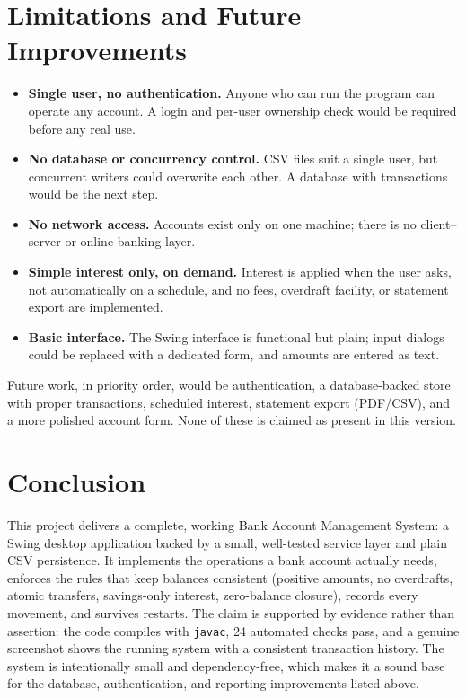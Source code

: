 \documentclass[11pt,a4paper]{report}
\begin{document}
\section{Limitations and Future Improvements}
\label{sec:limitations}
\begin{itemize}
    \item \textbf{Single user, no authentication.} Anyone who can run the program can operate any account. A login and per-user ownership check would be required before any real use.
    \item \textbf{No database or concurrency control.} CSV files suit a single user, but concurrent writers could overwrite each other. A database with transactions would be the next step.
    \item \textbf{No network access.} Accounts exist only on one machine; there is no client--server or online-banking layer.
    \item \textbf{Simple interest only, on demand.} Interest is applied when the user asks, not automatically on a schedule, and no fees, overdraft facility, or statement export are implemented.
    \item \textbf{Basic interface.} The Swing interface is functional but plain; input dialogs could be replaced with a dedicated form, and amounts are entered as text.
\end{itemize}
Future work, in priority order, would be authentication, a database-backed store with proper transactions, scheduled interest, statement export (PDF/CSV), and a more polished account form. None of these is claimed as present in this version.

\section{Conclusion}
This project delivers a complete, working Bank Account Management System: a Swing desktop application backed by a small, well-tested service layer and plain CSV persistence. It implements the operations a bank account actually needs, enforces the rules that keep balances consistent (positive amounts, no overdrafts, atomic transfers, savings-only interest, zero-balance closure), records every movement, and survives restarts. The claim is supported by evidence rather than assertion: the code compiles with \texttt{javac}, 24 automated checks pass, and a genuine screenshot shows the running system with a consistent transaction history. The system is intentionally small and dependency-free, which makes it a sound base for the database, authentication, and reporting improvements listed above.
\end{document}
